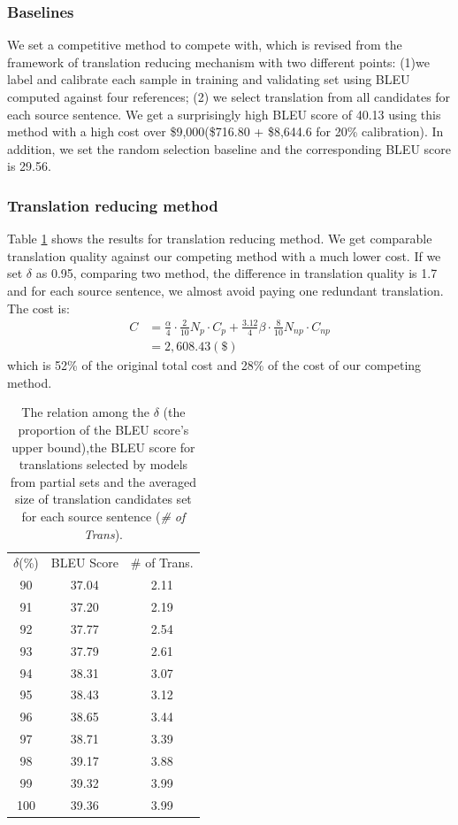 \documentclass[11pt,letterpaper]{article}
\begin{document}
\subsubsection{Baselines} We set a competitive method to compete with, which is revised from the framework of translation reducing mechanism with two different points: (1)we label and calibrate each sample in training and validating set using BLEU computed against four references; (2) we select translation from all candidates for each source sentence. We get a surprisingly high BLEU score of 40.13 using this method with a high cost over \$9,000(\$716.80 + \$8,644.6 for 20\% calibration). In addition, we set the random selection baseline and the corresponding BLEU score is 29.56.

\subsubsection{Translation reducing method} Table \ref{orderanother} shows the results for translation reducing method. We get comparable translation quality against our competing method with a much lower cost. If we set $\delta$ as 0.95, comparing two method, the difference in translation quality is 1.7 and for each source sentence, we almost avoid paying one redundant translation. The cost is:
 \begin{align*}
  C& = \frac{\alpha}{4} \cdot \frac{2}{10} N_{p}\cdot C_{p}  + \frac{3.12}{4} \beta\cdot \frac{8}{10} N_{np} \cdot C_{np}\\
   & = 2,608.43 (\$)
 \end{align*}
 which is 52\% of the original total cost and  28\% of the cost of our competing method.
 \begin{table}[h]
 \center
\begin{tabular}{c|c|c}
\hline
$\delta$(\%) & BLEU Score & \# of Trans. \\ \hhline{===}
90    & 37.04      & 2.11             \\
91    & 37.20      & 2.19             \\
92    & 37.77      & 2.54             \\
93    & 37.79      & 2.61             \\
94    & 38.31      & 3.07             \\
95    & 38.43      & 3.12             \\
96    & 38.65      & 3.44             \\
97    & 38.71      & 3.39             \\
98    & 39.17      & 3.88             \\
99    & 39.32      & 3.99             \\
100   & 39.36      & 3.99             \\ \hline
\end{tabular}
\caption{The relation among the $\delta$ (the proportion of the BLEU score's upper bound),the BLEU score for translations selected by models from partial sets and the averaged size of translation candidates set for each source sentence (\textit{\# of Trans}).  }
    \label{orderanother}
\end{table}
\end{document}
